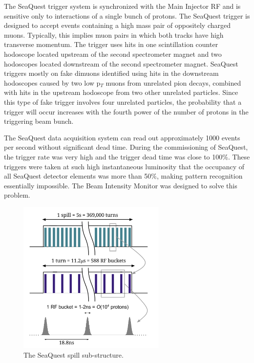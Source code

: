 The SeaQuest trigger system is synchronized with the Main Injector RF and is sensitive only to interactions of a single bunch of protons.  The SeaQuest trigger is designed to accept events containing a high mass pair of oppositely charged muons.  Typically, this implies muon pairs in which both tracks have high transverse momentum.  The trigger uses hits in one scintillation counter hodoscope located upstream of the second spectrometer magnet and two hodoscopes located downstream of the second spectrometer magnet.  SeaQuest triggers mostly on fake dimuons identified using hits in the downstream hodoscopes caused by two low p$_T$ muons from unrelated pion decays, combined with hits in the upstream hodoscope from two other unrelated particles.  Since this type of fake trigger involves four unrelated particles, the probability that a trigger will occur increases with the fourth power of the number of protons in the triggering beam bunch.

The SeaQuest data acquisition system can read out approximately 1000 events per second without significant dead time.  During the commissioning of SeaQuest, the trigger rate was very high and the trigger dead time was close to 100\%.  These triggers were taken at such high instantaneous luminosity that the occupancy of all SeaQuest detector elements was more than 50$\%$, making pattern recognition essentially impossible.  The Beam Intensity Monitor was designed to solve this problem.

\begin{figure}
	\begin{center}
		\includegraphics[width=0.65\textwidth]{figures/SpillStructure.png}
		\caption{The SeaQuest spill sub-structure.}
		\label{fig:BIMCerenkov}
	\end{center}
\end{figure}

